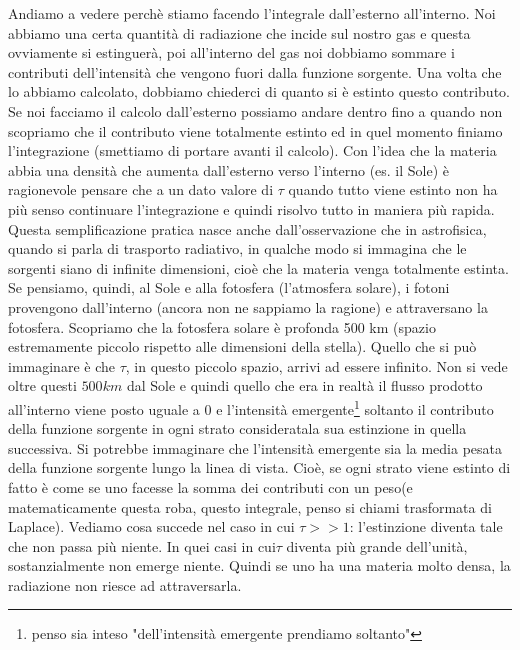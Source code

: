 \documentclass[a4paper,11pt]{article}
\begin{document}
\newline
Andiamo a vedere perchè stiamo facendo l'integrale dall'esterno all'interno. Noi abbiamo una certa quantità di radiazione che incide sul nostro gas e questa ovviamente si estinguerà, poi all'interno del gas noi dobbiamo sommare i contributi dell'intensità che vengono fuori dalla funzione sorgente. Una volta che lo abbiamo calcolato, dobbiamo chiederci di quanto si è estinto questo contributo. Se noi facciamo il calcolo dall'esterno possiamo andare dentro fino a quando non scopriamo che il contributo viene totalmente estinto ed in quel momento finiamo l'integrazione (smettiamo di portare avanti il calcolo). Con l'idea che la materia abbia una densità che aumenta dall'esterno verso l'interno (es. il Sole) è ragionevole pensare che a un dato valore di $\tau$ quando tutto viene estinto non ha più senso continuare l'integrazione e quindi risolvo tutto in maniera più rapida. Questa semplificazione pratica nasce anche dall'osservazione che in astrofisica, quando si parla di trasporto radiativo, in qualche modo si immagina che le sorgenti siano di infinite dimensioni, cioè che la materia venga totalmente estinta. Se pensiamo, quindi, al Sole e alla fotosfera (l'atmosfera solare), i fotoni provengono dall'interno (ancora non ne sappiamo la ragione) e attraversano la fotosfera. Scopriamo che la fotosfera solare è profonda 500 km (spazio estremamente piccolo rispetto alle dimensioni della stella). Quello che si può immaginare è che $\tau$, in questo piccolo spazio, arrivi ad essere infinito. Non si vede oltre questi $500km$ dal Sole e quindi quello che era in realtà il flusso prodotto all'interno viene posto uguale a 0 e l'intensità emergente\footnote{penso sia inteso "dell'intensità emergente prendiamo soltanto"} soltanto il contributo della funzione sorgente in ogni strato consideratala sua estinzione in quella successiva. Si potrebbe immaginare che l'intensità emergente sia la media pesata della funzione sorgente lungo la linea di vista. Cioè, se ogni strato viene estinto di fatto è come se uno facesse la somma dei contributi con un peso(e matematicamente questa roba, questo integrale, penso si chiami trasformata di Laplace).
\newline
\newline
Vediamo cosa succede nel caso in cui $\tau>>1$: l'estinzione diventa tale che non passa più niente. In quei casi in cui$\tau$ diventa più grande dell'unità, sostanzialmente non emerge niente. Quindi se uno ha una materia molto densa, la radiazione non riesce ad attraversarla.
\newline
\end{document}

